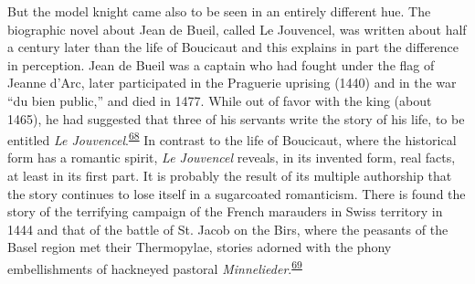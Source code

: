 But the model knight came also to be seen in an entirely different hue.
The biographic novel about Jean de Bueil, called Le Jouvencel, was
written about half a century later than the life of Boucicaut and this
explains in part the difference in perception. Jean de Bueil was a
captain who had fought under the flag of Jeanne d'Arc, later
participated in the Praguerie uprising (1440) and in the war ``du
\protect\hypertarget{10_Chapter_Three__THE_HEROIC_DREAM.xhtmlux5cux23page_80}{}{}bien
public,'' and died in 1477. While out of favor with the king (about
1465), he had suggested that three of his servants write the story of
his life, to be entitled \emph{Le
Jouvencel}.\textsuperscript{\protect\hypertarget{10_Chapter_Three__THE_HEROIC_DREAM.xhtmlux5cux23id_1798}{\protect\hyperlink{23_NOTES.xhtmlux5cux23id_1799}{68}}}
In contrast to the life of Boucicaut, where the historical form has a
romantic spirit, \emph{Le Jouvencel} reveals, in its invented form, real
facts, at least in its first part. It is probably the result of its
multiple authorship that the story continues to lose itself in a
sugarcoated romanticism. There is found the story of the terrifying
campaign of the French marauders in Swiss territory in 1444 and that of
the battle of St. Jacob on the Birs, where the peasants of the Basel
region met their Thermopylae, stories adorned with the phony
embellishments of hackneyed pastoral
\emph{Minnelieder}.\textsuperscript{\protect\hypertarget{10_Chapter_Three__THE_HEROIC_DREAM.xhtmlux5cux23id_1796}{\protect\hyperlink{23_NOTES.xhtmlux5cux23id_1797}{69}}}

